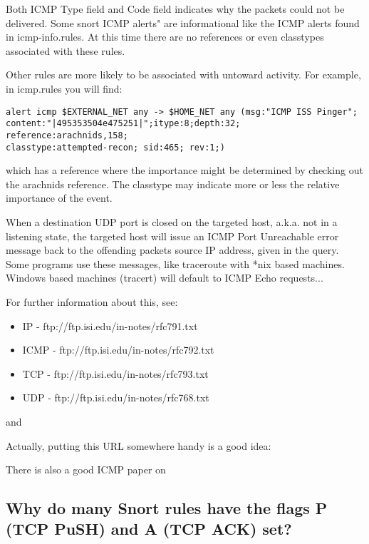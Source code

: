 \documentclass{article}
\begin{document}
Both ICMP Type field and Code field indicates why the packets could
not be delivered.  Some snort ICMP alerts" are informational like the ICMP
alerts found in icmp-info.rules.  At this time there are no references
or even classtypes associated with these rules.

Other rules are more likely to be associated with untoward activity.  For
example, in icmp.rules you will find:

\begin{verbatim}
alert icmp $EXTERNAL_NET any -> $HOME_NET any (msg:"ICMP ISS Pinger"; 
content:"|495353504e475251|";itype:8;depth:32; reference:arachnids,158; 
classtype:attempted-recon; sid:465; rev:1;)
\end{verbatim}

which has a reference where the importance might be determined by checking
out the arachnids reference.  The classtype may indicate more or
less the relative importance of the event.

When a destination UDP port is closed on the targeted host, a.k.a. not
in a listening state, the targeted host will issue an ICMP Port Unreachable
error message back to the offending packets source IP address, given in
the query.  Some programs use these messages, like traceroute with *nix
based machines. Windows based machines (tracert) will default to
ICMP Echo requests...

For further information about this, see:
\begin{itemize}
\item IP - ftp://ftp.isi.edu/in-notes/rfc791.txt
\item ICMP - ftp://ftp.isi.edu/in-notes/rfc792.txt
\item TCP - ftp://ftp.isi.edu/in-notes/rfc793.txt
\item UDP - ftp://ftp.isi.edu/in-notes/rfc768.txt
\end{itemize}

and


Actually, putting this URL somewhere handy is a good idea:


There is also a good ICMP paper on 

\subsection{Why do many Snort rules have the flags P (TCP PuSH) and A (TCP ACK) set? }
\end{document}

